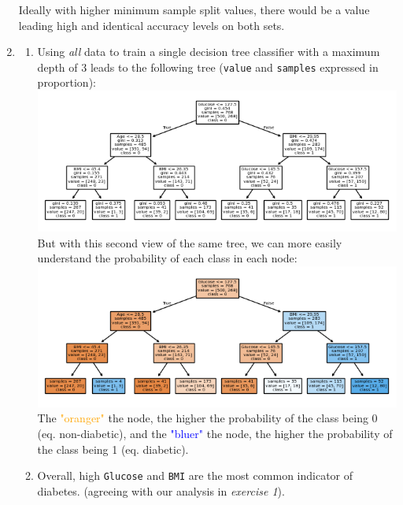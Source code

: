 \documentclass[12pt]{article}
\begin{document}
\begin{enumerate}[leftmargin=\labelsep, label=\textbf{\arabic*.)}]
          Ideally with higher minimum sample split values, there would be a value leading high and identical accuracy levels on both sets.
    \item \begin{enumerate}[label=\textbf{\roman*.)}]
              \item Using \textit{all} data to train a single decision tree classifier with a maximum depth of 3 leads to the following tree (\texttt{value} and \texttt{samples} expressed in proportion):\\
                    \includegraphics{decision_tree_value_counts.png}\\
                    \vspace{2em}
                    But with this second view of the same tree, we can more easily understand the probability of each class in each node:\\
                    \includegraphics{decision_tree.png} \\
                    The \textcolor{orange}{"oranger"} the node, the higher the probability of the class being 0 (eq. non-diabetic), and the \textcolor{blue}{"bluer"} the node, the higher the probability of the class being 1 (eq. diabetic). \\
              \item Overall, high \texttt{Glucose} and \texttt{BMI} are the most common indicator of diabetes. (agreeing with our analysis in \textit{exercise 1}). \\\vspace{0.25em}

\end{enumerate}
\end{enumerate}
\end{document}

